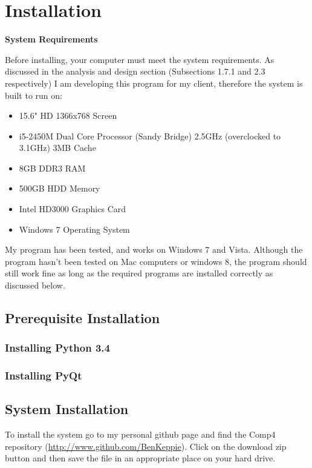 \section{Installation}

\textbf{System Requirements}

Before installing, your computer must meet the system requirements. As discussed in the analysis and design section (Subsections 1.7.1  and 2.3 respectively) I am developing this program for my client, therefore the system is built to run on:

\begin{itemize}
    \item 15.6" HD 1366x768 Screen
    \item i5-2450M Dual Core Processor (Sandy Bridge) 2.5GHz (overclocked to 3.1GHz) 3MB Cache
    \item 8GB DDR3 RAM
    \item 500GB HDD Memory
    \item Intel HD3000 Graphics Card
    \item Windows 7 Operating System
\end{itemize}

My program has been tested, and works on Windows 7 and Vista. Although the program hasn't been tested on Mac computers or windows 8, the program should still work fine as long as the required programs are installed correctly as discussed below.




\subsection{Prerequisite Installation}


\subsubsection{Installing Python 3.4}

\subsubsection{Installing PyQt}



\subsection{System Installation}

To install the system go to my personal github page and find the Comp4 repository (\url{http://www.github.com/BenKeppie}). Click on the download zip button and then save the file in an appropriate place on your hard drive.

